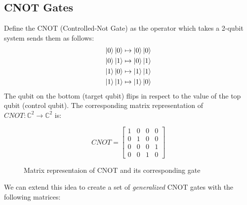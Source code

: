 \documentclass[quantum.tex]{subfiles}
\begin{document}
\subsection{CNOT Gates}
Define the CNOT (Controlled-Not Gate) as the operator which takes a 2-qubit system sends them as follows:
\begin{gather*}
  \ket{0}\ket{0} \mapsto \ket{0}\ket{0} \\
  \ket{0}\ket{1} \mapsto \ket{0}\ket{1} \\
  \ket{1}\ket{0} \mapsto \ket{1}\ket{1} \\
  \ket{1}\ket{1} \mapsto \ket{1}\ket{0}
\end{gather*}
The qubit on the bottom (target qubit) flips in respect to the value of the top qubit (control qubit). The corresponding matrix representation of $CNOT: \mathbb{C}^2 \rightarrow \mathbb{C}^2$ is:

\begin{figure}[h]
  \centering
  \begin{equation}
    CNOT = \begin{bmatrix}1 & 0 & 0 & 0 \\ 0 & 1 & 0 & 0 \\ 0 & 0 & 0 & 1 \\ 0 & 0 & 1 & 0 \end{bmatrix}
  \end{equation}
    \caption{Matrix representaion of CNOT and its corresponding gate}
\end{figure}

We can extend this idea to create a set of \textit{generalized} CNOT gates with the following matrices:
\end{document}
